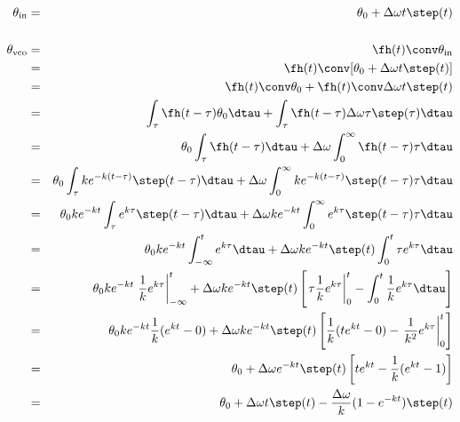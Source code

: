 \begin{eqnarray*}
  \theta_{\mathrm{in}} &=& \theta_0 + \Delta\omega t\step(t)
\\
\\
  \theta_{\mathrm{vco}}
    &=& \fh(t) \conv \theta_{\mathrm{in}}
  \\&=& \fh(t) \conv [\theta_0 + \Delta\omega t \step(t)]
  \\&=& \fh(t)\conv\theta_0 + \fh(t)\conv\Delta\omega t \step(t)
  \\&=& \int_{\tau}\fh(t-\tau)\theta_0\dtau + 
        \int_{\tau}\fh(t-\tau) \Delta\omega \tau \step(\tau)\dtau
  \\&=& \theta_0\int_{\tau}\fh(t-\tau)\dtau + 
        \Delta\omega \int_0^\infty \fh(t-\tau) \tau \dtau
  \\&=& \theta_0\int_{\tau} k e^{-k(t-\tau)}\step(t-\tau)\dtau + 
        \Delta\omega \int_0^\infty ke^{-k(t-\tau)}\step(t-\tau) \tau \dtau
  \\&=& \theta_0 k e^{-kt} \int_{\tau} e^{k\tau}\step(t-\tau)\dtau + 
        \Delta\omega ke^{-kt} \int_0^\infty e^{k\tau}\step(t-\tau) \tau \dtau
  \\&=& \theta_0 k e^{-kt} \int_{-\infty}^t e^{k\tau}\dtau + 
        \Delta\omega ke^{-kt} \step(t) \int_0^t \tau e^{k\tau} \dtau
  \\&=& \theta_0 k e^{-kt} \left. \frac{1}{k} e^{k\tau}\right|_{-\infty}^t + 
        \Delta\omega ke^{-kt} \step(t) 
        \left[ \left.\tau\frac{1}{k}e^{k\tau}\right|_0^t - \int_0^t \frac{1}{k}e^{k\tau} \dtau \right]
  \\&=& \theta_0 k e^{-kt} \frac{1}{k}(e^{kt}-0) + 
        \Delta\omega ke^{-kt} \step(t) 
        \left[ \frac{1}{k}(te^{kt}-0) - \left.\frac{1}{k^2}e^{k\tau}\right|_0^t \right]
  \\&=& \theta_0  + 
        \Delta\omega e^{-kt} \step(t) 
        \left[ te^{kt} - \frac{1}{k}(e^{kt}-1) \right]
  \\&=& \theta_0  + 
        \Delta\omega t \step(t) -
        \frac{\Delta\omega}{k}(1-e^{-kt})\step(t)
\end{eqnarray*}


